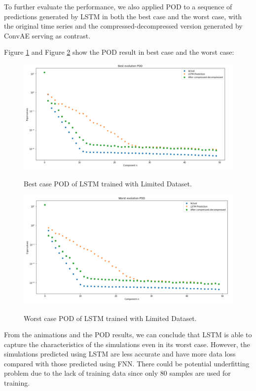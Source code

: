 To further evaluate the performance, we also applied POD to a sequence of predictions generated by LSTM in both the best case and the worst case, with the original time series and the compressed-decompressed version generated by ConvAE serving as contrast.

Figure \ref{figure:LSTM_limited_best_POD} and Figure \ref{figure:LSTM_limited_worst_POD} show the POD result in best case and the worst case:

\begin{figure}[H]
    \caption{Best case POD of LSTM trained with Limited Dataset.}
    \includegraphics[scale=0.5]{figures/mantle_convection_images/limited_dataset/LSTM_Best_POD.png}
    \label{figure:LSTM_limited_best_POD}
\end{figure}

\begin{figure}[H]
    \caption{Worst case POD of LSTM trained with Limited Dataset.}
    \includegraphics[scale=0.5]{figures/mantle_convection_images/limited_dataset/LSTM_Worst_POD.png}
    \label{figure:LSTM_limited_worst_POD}
\end{figure}

From the animations and the POD results, we can conclude that LSTM is able to capture the characteristics of the simulations even in its worst case. However, the simulations predicted using LSTM are less accurate and have more data loss compared with those predicted using FNN. There could be potential underfitting problem due to the lack of training data since only 80 samples are used for training.


